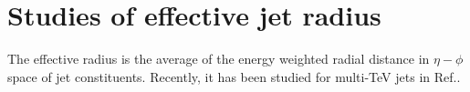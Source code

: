 \section{Studies of effective jet radius}
\label{sec:jets}


The effective radius is the average of the energy weighted radial distance in $\eta-\phi$ space of jet constituents.
Recently, it has been studied for multi-TeV jets in Ref.\cite{Auerbach:2014xua}.
 

\begin{figure}
\begin{center}
   \subfigure[40 TeV] {
}
\end{center}
\end{figure}
